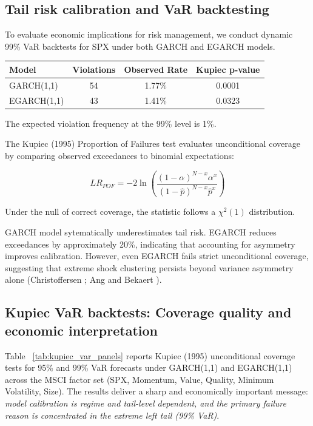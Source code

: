 \documentclass{article}
\begin{document}
\subsection{Tail risk calibration and VaR backtesting}

To evaluate economic implications for risk management, we conduct dynamic 99\% VaR backtests for SPX under both GARCH and EGARCH models.\newline

\begin{center}
\begin{tabular}{lccc}
\hline
Model & Violations & Observed Rate & Kupiec p-value \\
\hline
GARCH(1,1) & 54 & 1.77\% & 0.0001 \\
EGARCH(1,1) & 43 & 1.41\% & 0.0323 \\
\hline
\end{tabular}
\end{center}

The expected violation frequency at the 99\% level is 1\%.\newline

The Kupiec (1995) \cite{kupiec1995} Proportion of Failures test evaluates unconditional coverage by comparing observed exceedances to binomial expectations:\newline

\begin{equation}
LR_{POF} = -2 \ln
\left(
\frac{(1-\alpha)^{N-x} \alpha^x}
{(1-\hat{p})^{N-x} \hat{p}^x}
\right)
\end{equation}

Under the null of correct coverage, the statistic follows a $\chi^2(1)$ distribution.\newline

GARCH model sytematically underestimates tail risk. EGARCH reduces exceedances by approximately 20\%, indicating that accounting for asymmetry improves calibration. However, even EGARCH fails strict unconditional coverage, suggesting that extreme shock clustering persists beyond variance asymmetry alone (Christoffersen \cite{christoffersen1998}; Ang and Bekaert \cite{ang2002}).\newline

\subsection{Kupiec VaR backtests: Coverage quality and economic interpretation}

Table ~\ref{tab:kupiec_var_panels} reports Kupiec (1995) \cite{kupiec1995} unconditional coverage tests for 95\% and 99\% VaR forecasts under GARCH(1,1) and EGARCH(1,1) across the MSCI factor set (SPX, Momentum, Value, Quality, Minimum Volatility, Size). The results deliver a sharp and economically important message: \emph{model calibration is regime and tail-level dependent, and the primary failure reason is concentrated in the extreme left tail (99\% VaR)}. \newline
\end{document}
